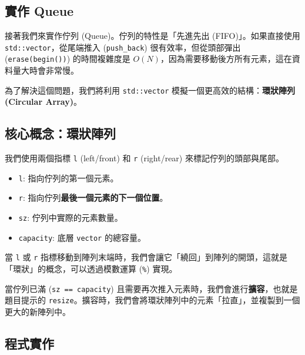 \subsection{實作 Queue}

接著我們來實作佇列 (Queue)。佇列的特性是「先進先出 (FIFO)」。如果直接使用 \verb|std::vector|，從尾端推入 (\verb|push_back|) 很有效率，但從頭部彈出 (\verb|erase(begin())|) 的時間複雜度是 $O(N)$，因為需要移動後方所有元素，這在資料量大時會非常慢。

為了解決這個問題，我們將利用 \verb|std::vector| 模擬一個更高效的結構：\textbf{環狀陣列 (Circular Array)}。

\subsection*{核心概念：環狀陣列}

我們使用兩個指標 \verb|l| (left/front) 和 \verb|r| (right/rear) 來標記佇列的頭部與尾部。
\begin{itemize}
    \item \verb|l|: 指向佇列的第一個元素。
    \item \verb|r|: 指向佇列\textbf{最後一個元素的下一個位置}。
    \item \verb|sz|: 佇列中實際的元素數量。
    \item \verb|capacity|: 底層 \verb|vector| 的總容量。
\end{itemize}
當 \verb|l| 或 \verb|r| 指標移動到陣列末端時，我們會讓它「繞回」到陣列的開頭，這就是「環狀」的概念，可以透過模數運算 (\verb|%|) 實現。

當佇列已滿 (\verb|sz == capacity|) 且需要再次推入元素時，我們會進行\textbf{擴容}，也就是題目提示的 \verb|resize|。擴容時，我們會將環狀陣列中的元素「拉直」，並複製到一個更大的新陣列中。

\subsection*{程式實作}

